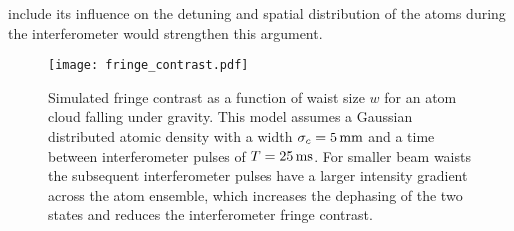 include its influence on the detuning and spatial distribution of the atoms
during the interferometer would strengthen this argument.
\begin{figure}[!htbp][!ht]
	\centering
	\texttt{[image: fringe\_contrast.pdf]}
	\caption[Simulated fringe contrast vs beam waist size]{Simulated fringe
		contrast as a function of waist size \(w\) for an atom cloud falling under
		gravity. This model assumes a Gaussian distributed atomic density with a
		width \(\sigma_c = \sivalue{5}{\milli\metre}\) and a time between
		interferometer pulses of \(T = \sivalue{25}{\milli\second}\). For smaller
		beam waists the subsequent interferometer pulses have a larger intensity
		gradient across the atom ensemble, which increases the dephasing of the two
		states and reduces the interferometer fringe contrast.}
	\label{fig:raman_fringecontrast}
\end{figure}

